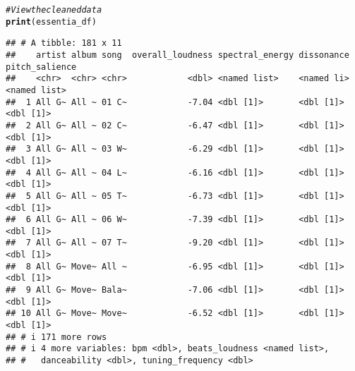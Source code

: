 \documentclass{article}\usepackage[]{graphicx}\usepackage[]{xcolor}
\makeatletter
\newcommand{\hlcom}[1]{\textcolor[rgb]{0.678,0.584,0.686}{\textit{#1}}}%
\newcommand{\hldef}[1]{\textcolor[rgb]{0.345,0.345,0.345}{#1}}%
\newcommand{\hlkwd}[1]{\textcolor[rgb]{0.737,0.353,0.396}{\textbf{#1}}}%
\newenvironment{kframe}{%
 \def\at@end@of@kframe{}%
 \ifinner\ifhmode%
  \def\at@end@of@kframe{\end{minipage}}%
  \begin{minipage}{\columnwidth}%
 \fi\fi%
 \def\FrameCommand##1{\hskip\@totalleftmargin \hskip-\fboxsep
 \colorbox{shadecolor}{##1}\hskip-\fboxsep
     \hskip-\linewidth \hskip-\@totalleftmargin \hskip\columnwidth}%
 \MakeFramed {\advance\hsize-\width
   \@totalleftmargin\z@ \linewidth\hsize
   \@setminipage}}%
 {\par\unskip\endMakeFramed%
 \at@end@of@kframe}
\newenvironment{knitrout}{}{} %
\makeatother
\begin{document}
\begin{enumerate}
\begin{knitrout}
\begin{kframe}
\begin{alltt}
\hlcom{# View the cleaned data}
\hlkwd{print}\hldef{(essentia_df)}
\end{alltt}
\begin{verbatim}
## # A tibble: 181 x 11
##    artist album song  overall_loudness spectral_energy dissonance pitch_salience
##    <chr>  <chr> <chr>            <dbl> <named list>    <named li> <named list>  
##  1 All G~ All ~ 01 C~            -7.04 <dbl [1]>       <dbl [1]>  <dbl [1]>     
##  2 All G~ All ~ 02 C~            -6.47 <dbl [1]>       <dbl [1]>  <dbl [1]>     
##  3 All G~ All ~ 03 W~            -6.29 <dbl [1]>       <dbl [1]>  <dbl [1]>     
##  4 All G~ All ~ 04 L~            -6.16 <dbl [1]>       <dbl [1]>  <dbl [1]>     
##  5 All G~ All ~ 05 T~            -6.73 <dbl [1]>       <dbl [1]>  <dbl [1]>     
##  6 All G~ All ~ 06 W~            -7.39 <dbl [1]>       <dbl [1]>  <dbl [1]>     
##  7 All G~ All ~ 07 T~            -9.20 <dbl [1]>       <dbl [1]>  <dbl [1]>     
##  8 All G~ Move~ All ~            -6.95 <dbl [1]>       <dbl [1]>  <dbl [1]>     
##  9 All G~ Move~ Bala~            -7.06 <dbl [1]>       <dbl [1]>  <dbl [1]>     
## 10 All G~ Move~ Move~            -6.52 <dbl [1]>       <dbl [1]>  <dbl [1]>     
## # i 171 more rows
## # i 4 more variables: bpm <dbl>, beats_loudness <named list>,
## #   danceability <dbl>, tuning_frequency <dbl>
\end{verbatim}
\end{kframe}
\end{knitrout}

\end{enumerate}

\end{document}
